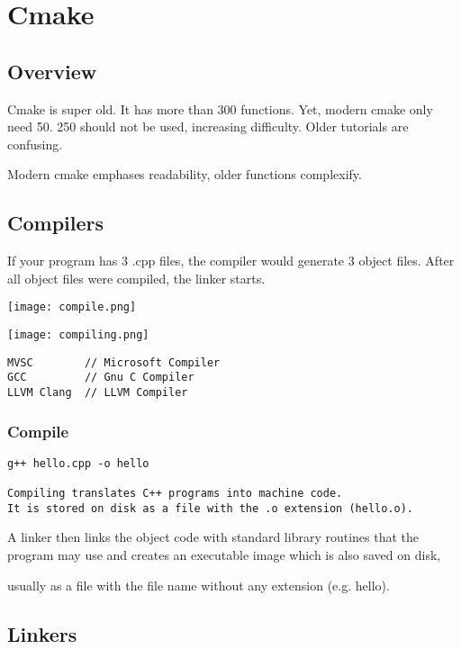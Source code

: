 \documentclass[openany]{report}
\begin{document}
\chapter{Cmake}

\section{Overview}

Cmake is super old. It has more than 300 functions.
Yet, modern cmake only need 50. 250 should not be used, increasing difficulty.
Older tutorials are confusing.

Modern cmake emphases readability, older functions complexify.

\section{Compilers}

If your program has 3 .cpp files, the compiler would generate 3 object files. 
After all object files were compiled, the linker starts. 

\begin{center}
\texttt{[image: compile.png]}
\end{center}

\begin{center}
\texttt{[image: compiling.png]}
\end{center}

\begin{verbatim}
MVSC        // Microsoft Compiler
GCC         // Gnu C Compiler
LLVM Clang  // LLVM Compiler
\end{verbatim}

\subsection{Compile}
\begin{verbatim}
g++ hello.cpp -o hello

Compiling translates C++ programs into machine code.
It is stored on disk as a file with the .o extension (hello.o). 
\end{verbatim}

A linker then links the object code with standard library routines
that the program may use and creates an executable image which is also saved on disk,

usually as a file with the file name without any extension (e.g. hello).

\section{Linkers}
\end{document}

